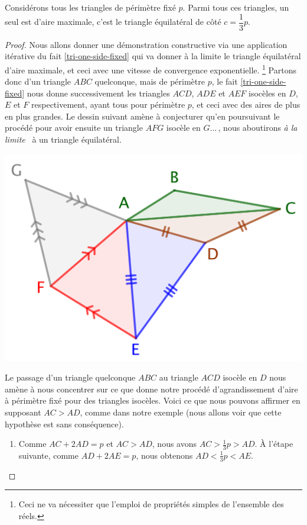 \begin{fact} \label{iso-tri}
	Considérons tous les triangles de périmètre fixé $p$. Parmi tous ces triangles, un seul est d'aire maximale, c'est le triangle équilatéral de côté $c = \dfrac13 p$.
\end{fact}


\begin{proof}	
	Nous allons donner une démonstration constructive via une application itérative du fait \ref{tri-one-side-fixed} qui va donner à la limite le triangle équilatéral d'aire maximale, et ceci avec une vitesse de convergence exponentielle.%
	\footnote{
		Ceci ne va nécessiter que l'emploi de propriétés simples de l'ensemble des réels.
	}
	Partons donc d'un triangle $ABC$ quelconque, mais de périmètre $p$, le fait \ref{tri-one-side-fixed} nous donne successivement les triangles $ACD$, $ADE$ et $AEF$ isocèles en $D$, $E$ et $F$ respectivement, ayant tous pour périmètre $p$, et ceci avec des aires de plus en plus grandes.  
	Le dessin suivant amène à conjecturer qu'en poursuivant le procédé pour avoir ensuite un triangle $AFG$ isocèle en $G$...\,, nous aboutirons \og \emph{à la limite} \fg\ à un triangle équilatéral.

	\begin{center}
		\includegraphics[scale=.4]{content/triangle-gene/proof.png}
	\end{center} 

	
	Le passage d'un triangle quelconque $ABC$ au triangle $ACD$ isocèle en $D$ nous amène à nous concentrer sur ce que donne notre procédé d'agrandissement d'aire à périmètre fixé pour des triangles isocèles. 
	Voici ce que nous pouvons affirmer en supposant $AC > AD$, comme dans notre exemple (nous allons voir que cette hypothèse est sans conséquence).
	\begin{enumerate}
		\item Comme $AC + 2 AD = p$ et $AC > AD$, nous avons $AC > \frac13 p > AD$.
		À l'étape suivante, comme $AD + 2 AE = p$, nous obtenons $AD < \frac13 p < AE$.



\end{enumerate}
\end{proof}
